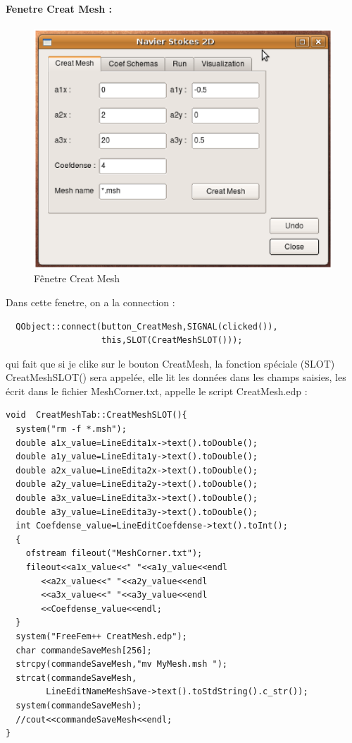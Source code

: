 \documentclass{book}
\begin{document}
\paragraph{Fenetre Creat Mesh :} 
\begin{center}
\begin{figure}[h]
 \includegraphics[scale=0.60]{CreatMesh}
 \caption{Fênetre Creat Mesh} 
\end{figure}
\end{center}
Dans cette fenetre, on a la connection :
\begin{lstlisting}
  QObject::connect(button_CreatMesh,SIGNAL(clicked()),
                   this,SLOT(CreatMeshSLOT()));
\end{lstlisting}
qui fait que si je clike sur le bouton CreatMesh, la fonction spéciale (SLOT) CreatMeshSLOT() sera appelée, elle lit les données dans les champs saisies, les écrit dans le fichier MeshCorner.txt, appelle le script CreatMesh.edp :
\begin{lstlisting}
void  CreatMeshTab::CreatMeshSLOT(){
  system("rm -f *.msh");
  double a1x_value=LineEdita1x->text().toDouble();
  double a1y_value=LineEdita1y->text().toDouble();
  double a2x_value=LineEdita2x->text().toDouble();
  double a2y_value=LineEdita2y->text().toDouble();
  double a3x_value=LineEdita3x->text().toDouble();
  double a3y_value=LineEdita3y->text().toDouble();
  int Coefdense_value=LineEditCoefdense->text().toInt();
  {
    ofstream fileout("MeshCorner.txt");
    fileout<<a1x_value<<" "<<a1y_value<<endl
	   <<a2x_value<<" "<<a2y_value<<endl
	   <<a3x_value<<" "<<a3y_value<<endl
	   <<Coefdense_value<<endl;
  }
  system("FreeFem++ CreatMesh.edp");
  char commandeSaveMesh[256];
  strcpy(commandeSaveMesh,"mv MyMesh.msh ");
  strcat(commandeSaveMesh,
        LineEditNameMeshSave->text().toStdString().c_str());
  system(commandeSaveMesh);
  //cout<<commandeSaveMesh<<endl;
} 
\end{lstlisting}
\end{document}
